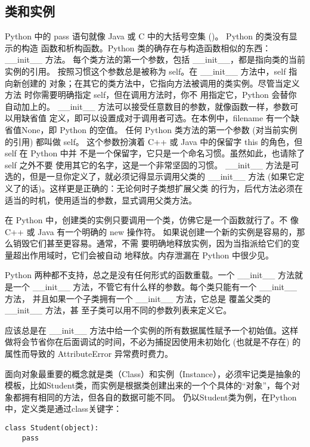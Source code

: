 \documentclass[twoside,11pt]{book}
\begin{document}
\subsection{类和实例}

Python 中的 pass 语句就像 Java 或 C 中的大括号空集 ({})。
Python 的类没有显示的构造 函数和析构函数。Python 类的确存在与构造函数相似的东西：\_\_init\_\_ 方法。
每个类方法的第一个参数，包括 \_\_init\_\_，都是指向类的当前实例的引用。 按照习惯这个参数总是被称为 self。在 \_\_init\_\_ 方法中，self 指向新创建的 对象；在其它的类方法中，它指向方法被调用的类实例。尽管当定义方法 时你需要明确指定 self，但在调用方法时，你不 用指定它，Python 会替你 自动加上的。
\_\_init\_\_ 方法可以接受任意数目的参数，就像函数一样，参数可以用缺省值 定义，即可以设置成对于调用者可选。在本例中，filename 有一个缺省值None，即 Python 的空值。
任何 Python 类方法的第一个参数 (对当前实例的引用) 都叫做 self。 这个参数扮演着 C++ 或 Java 中的保留字 this 的角色，但 self 在 Python 中并 不是一个保留字，它只是一个命名习惯。虽然如此，也请除了 self 之外不要 使用其它的名字，这是一个非常坚固的习惯。
\_\_init\_\_ 方法是可选的，但是一旦你定义了，就必须记得显示调用父类的
\_\_init\_\_ 方法 (如果它定义了的话)。这样更是正确的：无论何时子类想扩展父类 的行为，后代方法必须在适当的时机，使用适当的参数，显式调用父类方法。


在 Python 中，创建类的实例只要调用一个类，仿佛它是一个函数就行了。不 像 C++ 或 Java 有一个明确的 new 操作符。
如果说创建一个新的实例是容易的，那么销毁它们甚至更容易。通常，不需 要明确地释放实例，因为当指派给它们的变量超出作用域时，它们会被自动 地释放。内存泄漏在 Python 中很少见。

Python 两种都不支持，总之是没有任何形式的函数重载。一个 \_\_init\_\_ 方法就 是一个 \_\_init\_\_ 方法，不管它有什么样的参数。每个类只能有一个 \_\_init\_\_ 方法， 并且如果一个子类拥有一个 \_\_init\_\_ 方法，它总是 覆盖父类的 \_\_init\_\_ 方法，甚 至子类可以用不同的参数列表来定义它。

应该总是在 \_\_init\_\_ 方法中给一个实例的所有数据属性赋予一个初始值。这样 做将会节省你在后面调试的时间，不必为捕捉因使用未初始化 (也就是不存在) 的属性而导致的 AttributeError 异常费时费力。


面向对象最重要的概念就是类（Class）和实例（Instance），必须牢记类是抽象的模板，比如Student类，而实例是根据类创建出来的一个个具体的“对象”，每个对象都拥有相同的方法，但各自的数据可能不同。
仍以Student类为例，在Python中，定义类是通过class关键字：

\begin{lstlisting}
class Student(object):
    pass
\end{lstlisting}
\end{document}

